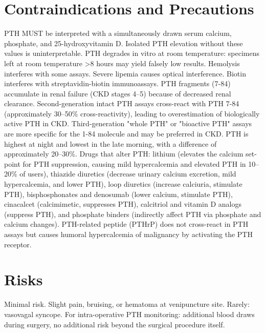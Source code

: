 \section*{Contraindications and Precautions}
PTH MUST be interpreted with a simultaneously drawn serum calcium, phosphate, and 25-hydroxyvitamin D. Isolated PTH elevation without these values is uninterpretable. PTH degrades in vitro at room temperature: specimens left at room temperature >8 hours may yield falsely low results. Hemolysis interferes with some assays. Severe lipemia causes optical interference. Biotin interferes with streptavidin-biotin immunoassays. PTH fragments (7-84) accumulate in renal failure (CKD stages 4--5) because of decreased renal clearance. Second-generation intact PTH assays cross-react with PTH 7-84 (approximately 30--50\% cross-reactivity), leading to overestimation of biologically active PTH in CKD. Third-generation "whole PTH" or "bioactive PTH" assays are more specific for the 1-84 molecule and may be preferred in CKD. PTH is highest at night and lowest in the late morning, with a difference of approximately 20--30\%. Drugs that alter PTH: lithium (elevates the calcium set-point for PTH suppression, causing mild hypercalcemia and elevated PTH in 10--20\% of users), thiazide diuretics (decrease urinary calcium excretion, mild hypercalcemia, and lower PTH), loop diuretics (increase calciuria, stimulate PTH), bisphosphonates and denosumab (lower calcium, stimulate PTH), cinacalcet (calcimimetic, suppresses PTH), calcitriol and vitamin D analogs (suppress PTH), and phosphate binders (indirectly affect PTH via phosphate and calcium changes). PTH-related peptide (PTHrP) does not cross-react in PTH assays but causes humoral hypercalcemia of malignancy by activating the PTH receptor.

\section*{Risks}
Minimal risk. Slight pain, bruising, or hematoma at venipuncture site. Rarely: vasovagal syncope. For intra-operative PTH monitoring: additional blood draws during surgery, no additional risk beyond the surgical procedure itself.

